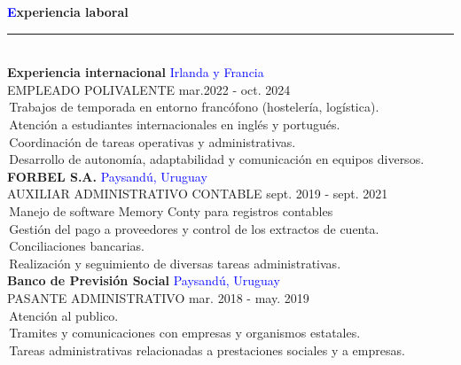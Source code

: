 \documentclass[a4paper,10pt]{article}
\begin{document}
\begin{spacing}{1.1}
\noindent
{\Large\textbf{\textcolor{blue}{E}xperiencia laboral}}
\hspace{0.3em}\rule[0.9ex]{\dimexpr\textwidth-14em}{0.4pt} \\[6pt]
\textbf{Experiencia internacional} \hfill \textcolor{blue}{Irlanda y Francia} \\
EMPLEADO POLIVALENTE \hfill mar.2022 - oct. 2024 \\ 
\textbullet \,Trabajos de temporada en entorno francófono (hostelería, logística). \\
\textbullet \,Atención a estudiantes internacionales en inglés y portugués.\\
\textbullet \,Coordinación de tareas operativas y administrativas. \\
\textbullet \,Desarrollo de autonomía, adaptabilidad y comunicación en equipos diversos. \\ [6pt]
\textbf{FORBEL S.A.} \hfill \textcolor{blue}{Paysandú, Uruguay} \\
AUXILIAR ADMINISTRATIVO CONTABLE \hfill sept. 2019 - sept. 2021 \\
\textbullet \,Manejo de software Memory Conty para registros contables \\
\textbullet \,Gestión del pago a proveedores y control de los extractos de cuenta. \\
\textbullet \,Conciliaciones bancarias. \\
\textbullet \,Realización y seguimiento de diversas tareas administrativas. \\ [6pt]
\textbf{Banco de Previsión Social} \hfill \textcolor{blue}{Paysandú, Uruguay} \\ 
PASANTE ADMINISTRATIVO \hfill mar. 2018 - may. 2019 \\
\textbullet \,Atención al publico. \\
\textbullet \,Tramites y comunicaciones con empresas y organismos estatales. \\
\textbullet \,Tareas administrativas relacionadas a prestaciones sociales y a empresas. \\


\end{spacing}
\end{document}

